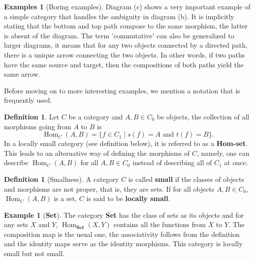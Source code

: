 \documentclass{article}
\theoremstyle{definition}
\newtheorem{defn}[thm]{Definition}
\newtheorem{exmp}[thm]{Example}
\newtheorem{exmps}[thm]{Examples}
\theoremstyle{remark}
\DeclareMathOperator{\Hom}{Hom}
\begin{document}
\begin{exmps}[Boring examples]
	Diagram (c) shows a very important example of a simple category that handles the ambiguity in diagram (b). It is implicitly stating that the bottom and top path compose to the same morphism, the latter is absent of the diagram. The term 'commutative' can also be generalized to larger diagrams, it means that for any two objects connected by a directed path, there is a unique arrow connecting the two objects. In other words, if two paths have the same source and target, then the compositions of both paths yield the same arrow.
\end{exmps}
Before moving on to more interesting examples, we mention a notation that is frequently used.
\begin{defn}
	Let $C$ be a category and $A,B \in C_0$ be objects, the collection of all morphisms going from $A$ to $B$ is 
	\[\Hom_{C}(A,B) = \{f \in C_1 \mid s(f) = A \text{ and } t(f) = B\}.\]
	In a locally small category (see definition below), it is referred to as a \textbf{Hom-set}. This leads to an alternative way of defining the morphisms of $C$, namely, one can describe $\Hom_C(A,B)$ for all $A, B \in C_0$ instead of describing all of $C_1$ at once. 
\end{defn}
\begin{defn}[Smallness]
	A category $C$ is called \textbf{small} if the classes of objects and morphisms are not proper, that is, they are sets. If for all objects $A,B \in C_0$, $\Hom_C(A,B)$ is a set, $C$ is said to be \textbf{locally small}. 
\end{defn}
\begin{exmp}[\textbf{\textbf{Set}}]
	The category \textbf{Set} has the class of sets as its objects and for any sets $X$ and $Y$, $\Hom_{\textbf{Set}}(X,Y)$ contains all the functions from $X$ to $Y$. The composition map is the usual one, the associativity follows from the definition and the identity maps serve as the identity morphisms. This category is locally small but not small.
\end{exmp}
\end{document}
